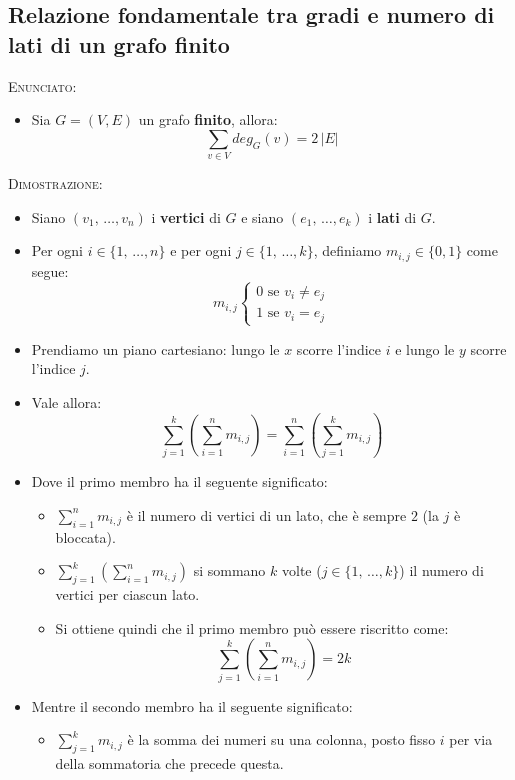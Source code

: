 \documentclass[10pt]{article}
\begin{document}
\subsection{Relazione fondamentale tra gradi e numero di lati di un grafo finito}
\textsc{Enunciato:}
\begin{itemize}
\item
Sia $G = (V,E)$ un grafo \textbf{finito}, allora:
$$\displaystyle{\sum_{v \in V} deg_G (v) = 2\,|E|}$$
\end{itemize}
\textsc{Dimostrazione:}
\begin{itemize}
\item
Siano $(v_1, \,\dotso,v_n)$ i \textbf{vertici} di $G$ e siano $(e_1, \,\dotso, e_k)$ i \textbf{lati} di $G$.
\item
Per ogni $i \in \{1,\,\dotso, n\}$ e per ogni $j \in \{1,\,\dotso, k\}$, definiamo $m_{i,j} \in \{0,1\}$ come segue:
$$m_{i,j} \begin{cases} 0 \textrm{ se } v_i \neq e_j \\ 1 \textrm{ se } v_i = e_j \end{cases}$$
\item
Prendiamo un piano cartesiano: lungo le $x$ scorre l'indice $i$ e lungo le $y$ scorre l'indice $j$. 
\item
Vale allora:
$$\displaystyle{\sum_{j = 1}^{k} \left(\sum_{i = 1}^{n} m_{i,j} \right) = \sum_{i = 1}^{n} \left(\sum_{j = 1}^{k} m_{i,j} \right)}
$$
\item
Dove il primo membro ha il seguente significato:
\begin{itemize}
\item
$\displaystyle{\sum_{i = 1}^{n} m_{i,j}}$ è il numero di vertici di un lato, che è sempre $2$ (la $j$ è bloccata).
\item
$\displaystyle{\sum_{j = 1}^{k} \left(\sum_{i = 1}^{n} m_{i,j}\right)}$ si sommano $k$ volte ($j \in \{1,\,\dotso,k\}$) il numero di vertici per ciascun lato.
\item
Si ottiene quindi che il primo membro può essere riscritto come:
$$\displaystyle{\sum_{j = 1}^{k} \left(\sum_{i = 1}^{n} m_{i,j}\right) = 2k}$$
\end{itemize}
\item
Mentre il secondo membro ha il seguente significato:
\begin{itemize}
\item
$\displaystyle{\sum_{j = 1}^{k} m_{i,j}}$ è la somma dei numeri su una colonna, posto fisso $i$ per via della sommatoria che precede questa.

\end{itemize}
\end{itemize}
\end{document}
